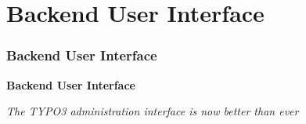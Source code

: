 %

\section{Backend User Interface}
\begin{frame}[fragile]
	\frametitle{Backend User Interface}

	\begin{center}\huge{\color{typo3darkgrey}\textbf{Backend User Interface}}\end{center}
	\begin{center}\large{\textit{The TYPO3 administration interface is now better than ever}}\end{center}

\end{frame}

